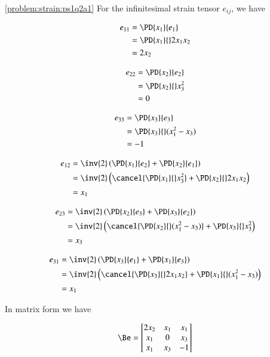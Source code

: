 \begin{Answer}[ref={problem:strain:ps1q2a}]

\ref{problem:strain:ps1q2a1} For the infinitesimal strain tensor $e_{ij}$, we have

\begin{align*}
e_{11}
&= \PD{x_1}{e_1} \\
&= \PD{x_1}{}2 x_1 x_2 \\
&= 2 x_2
\end{align*}

\begin{align*}
e_{22}
&= \PD{x_2}{e_2} \\
&= \PD{x_2}{} x_3^2 \\
&= 0
\end{align*}

\begin{align*}
e_{33}
&= \PD{x_3}{e_3} \\
&= \PD{x_3}{} ( x_1^2 - x_3 ) \\
&= -1
\end{align*}

\begin{align*}
e_{12}
&=
\inv{2} \left(
\PD{x_1}{e_2}
+
\PD{x_2}{e_1}
\right) \\
&=
\inv{2}
\left(
\cancel{\PD{x_1}{} x_3^2 }
+
\PD{x_2}{} 2 x_1 x_2
\right) \\
&=
x_1
\end{align*}

\begin{align*}
e_{23}
&=
\inv{2} \left(
\PD{x_2}{e_3}
+
\PD{x_3}{e_2}
\right) \\
&=
\inv{2}
\left(
\cancel{\PD{x_2}{} (x_1^2 - x_3 )}
+
\PD{x_3}{} x_3^2
\right) \\
&=
x_3
\end{align*}

\begin{align*}
e_{31}
&=
\inv{2} \left(
\PD{x_3}{e_1}
+
\PD{x_1}{e_3}
\right) \\
&=
\inv{2}
\left(
\cancel{\PD{x_3}{} 2 x_1 x_2 }
+
\PD{x_1}{} (x_1^2 - x_3 )
\right) \\
&=
x_1
\end{align*}

In matrix form we have

\begin{equation}\label{eqn:continuumProblemSet1:250}
\Be =
\begin{bmatrix}
2 x_2 & x_1 & x_1 \\
x_1 & 0 & x_3 \\
x_1 & x_3 & -1 \\
\end{bmatrix}
\end{equation}


\end{Answer}
